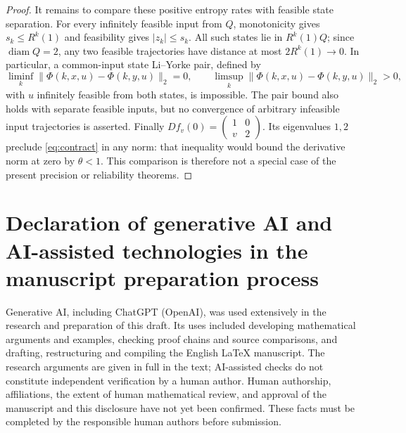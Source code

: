 \documentclass[11pt]{amsart}
\theoremstyle{definition}
\theoremstyle{remark}
\newcommand{\diam}{\operatorname{diam}}
\numberwithin{equation}{section}
\begin{document}
\begin{proof}
It remains to compare these positive entropy rates with feasible
state separation. For every infinitely feasible input from $Q$,
monotonicity gives
$s_k\le R^k(1)$ and feasibility gives $|z_k|\le s_k$.
All such states lie in $R^k(1)Q$; since $\diam Q=2$, any two
feasible trajectories have distance at most $2R^k(1)\to0$.
In particular, a common-input state Li--Yorke pair, defined by
\[
\liminf_k\|\Phi(k,x,u)-\Phi(k,y,u)\|_2=0,
\qquad \limsup_k\|\Phi(k,x,u)-\Phi(k,y,u)\|_2>0,
\]
with $u$ infinitely feasible from both states, is impossible.
The pair bound also holds with separate feasible inputs, but no
convergence of arbitrary infeasible input trajectories is asserted.
Finally $Df_v(0)=\left(\begin{smallmatrix}1&0\\v&2\end{smallmatrix}\right)$.
Its eigenvalues $1,2$ preclude \eqref{eq:contract} in any norm:
that inequality would bound the derivative norm at zero by
$\theta<1$. This comparison is therefore not a special case
of the present precision or reliability theorems.
\end{proof}

\section*{Declaration of generative AI and AI-assisted technologies
in the manuscript preparation process}
Generative AI, including ChatGPT (OpenAI), was used extensively
in the research and preparation of this draft. Its uses included
developing mathematical arguments and examples, checking proof
chains and source comparisons, and drafting, restructuring and
compiling the English LaTeX manuscript. The research arguments are
given in full in the text; AI-assisted checks do not constitute
independent verification by a human author. Human authorship,
affiliations, the extent of human mathematical review, and approval
of the manuscript and this disclosure have not yet been confirmed.
These facts must be completed by the responsible human authors
before submission.
\end{document}
